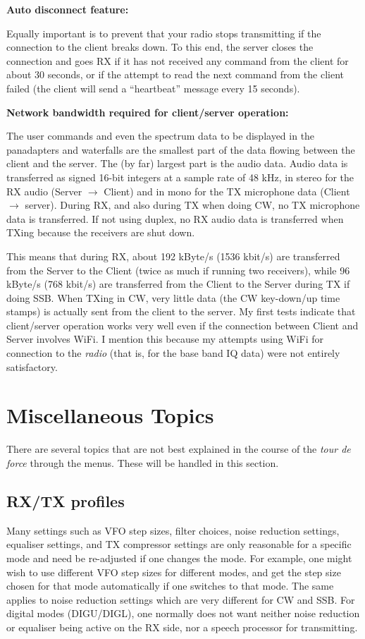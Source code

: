 \documentclass[12pt]{book}
\begin{document}
\textbf{Auto disconnect feature:}

Equally important is to prevent that your radio stops transmitting if
the connection to the client breaks down. To this end, the server closes the connection and goes RX if
it has not received any command from the client for about 30 seconds, or if the attempt to read the
next command from the client failed (the client will send a
``heartbeat'' message every 15 seconds).

\textbf{Network bandwidth required for client/server operation:}

 The user commands and even the spectrum
data to be displayed in the panadapters and waterfalls are the smallest part of the data flowing between the client
and the server. The (by far) largest part is the audio data. Audio data is transferred as signed 16-bit integers
at a sample rate of 48 kHz, in stereo for the RX audio (Server $\to$ Client) and in mono for the TX
microphone data (Client $\to$ server). During RX, and also during TX when doing CW, no TX microphone data
is transferred. If not using duplex, no RX audio data is transferred when TXing because the receivers are shut down.

This means that during RX, about 192 kByte/s (1536 kbit/s) are transferred from the Server to the Client
(twice as much if running two receivers), while 96 kByte/s (768 kbit/s)  are transferred
from the Client to the Server during
TX if doing SSB. When TXing in CW, very little data (the CW key-down/up time stamps) is actually sent from the client
to the server.
My first tests indicate that client/server operation works very well even
if  the connection between Client and Server
involves WiFi. I mention this because my attempts using WiFi for connection to the \textit{radio}
(that is, for the base band IQ data) were not entirely satisfactory.
\chapter{Miscellaneous Topics}
There are several topics that are not best explained in the course of the \textit{tour de force} through
the menus. These will be handled in this section.

\section{RX/TX profiles}
\label{sec:rxtxprofiles}
Many settings such as VFO step sizes, filter choices, noise reduction
settings, equaliser settings, and TX compressor settings
are only reasonable for a specific mode and need be re-adjusted if one changes
the mode. For example, one might wish to use
different VFO step sizes for different modes, and get the step size chosen for that
mode automatically if one switches to that mode. The same applies to noise reduction
settings which are very different for CW and SSB. For digital modes (DIGU/DIGL),
one normally does not want neither noise reduction or equaliser being active on the RX
side, nor a speech processor for transmitting.
\end{document}
